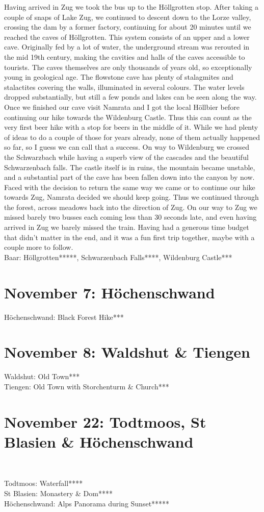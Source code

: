 Having arrived in Zug we took the bus up to the H\"ollgrotten stop. After taking a couple of snaps of Lake Zug, we continued to descent down to the Lorze valley, crossing the dam by a former factory, continuing for about 20 minutes until we reached the caves of H\"ollgrotten. This system consists of an upper and a lower cave. Originally fed by a lot of water, the underground stream was rerouted in the mid 19th century, making the cavities and halls of the caves accessible to tourists. The caves themselves are only thousands of years old, so exceptionally young in geological age. The flowstone cave has plenty of stalagmites and stalactites covering the walls, illuminated in several colours. The water levels dropped substantially, but still a few ponds and lakes can be seen along the way.\\
Once we finished our cave visit Namrata and I got the local H\"ollbier before continuing our hike towards the Wildenburg Castle. Thus this can count as the very first beer hike with a stop for beers in the middle of it. While we had plenty of ideas to do a couple of those for years already, none of them actually happened so far, so I guess we can call that a success. On way to Wildenburg we crossed the Schwarzbach while having a superb view of the cascades and the beautiful Schwarzenbach falls. The castle itself is in ruins, the mountain became unstable, and a substantial part of the cave has been fallen down into the canyon by now. Faced with the decision to return the same way we came or to continue our hike towards Zug, Namrata decided we should keep going. Thus we continued through the forest, across meadows back into the direction of Zug. On our way to Zug we missed barely two busses each coming less than 30 seconds late, and even having arrived in Zug we barely missed the train. Having had a generous time budget that didn't matter in the end, and it was a fun first trip together, maybe with a couple more to follow.\\

Baar: H\"ollgrotten*****, Schwarzenbach Falls****, Wildenburg Castle***
 
\section{November 7: H\"ochenschwand}
\label{2020HoechenschwandI}

H\"ochenschwand: Black Forest Hike***

\section{November 8: Waldshut \& Tiengen}
\label{2021WaldshutTiengen}

Waldshut: Old Town***\\
Tiengen: Old Town with Storchenturm \& Church***\\

\section{November 22: Todtmoos, St Blasien \& H\"ochenschwand}\
\label{2021:Todtmoos}

Todtmoos: Waterfall****\\
St Blasien: Monastery \& Dom****\\
H\"ochenschwand: Alps Panorama during Sunset*****\\

